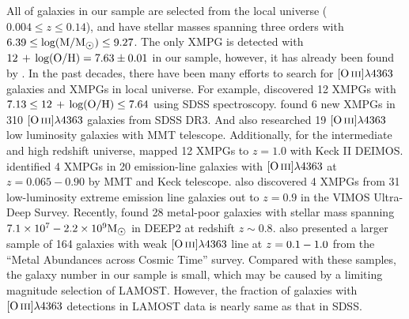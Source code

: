 \documentclass[usenatbib]{raa}
\begin{document}
All of galaxies in our sample  are selected from the local universe 
($0.004 \le z \le 0.14$), and have stellar masses  spanning 
three orders with $\rm 6.39 \le log(M/M_{\hbox{$\odot$}}) \le 9.27$. The only
XMPG is detected with $\hbox{$12\, +\, {\rm log(O/H)}$} = 7.63 \pm 0.01$ in our sample, however, it has already been found by 
\cite{2012AA...546A.122I}. In the past decades, there have been many efforts to search 
for $\hbox{[O\,{\sc iii}]}\lambda4363$ galaxies and XMPGs in local universe. For example, 
\cite{2003ApJ...593L..73K} discovered 12 XMPGs with $\rm 7.13 \le \hbox{$12\, +\, {\rm log(O/H)}$} 
\le 7.64$ using SDSS spectroscopy. \cite{2006AA...448..955I} found
6 new XMPGs in 310 $\hbox{[O\,{\sc iii}]}\lambda4363$ galaxies from SDSS DR3. And
\cite{2012ApJ...754...98B} also researched 19 $\hbox{[O\,{\sc iii}]}\lambda4363$ 
low luminosity galaxies with MMT telescope.
Additionally, for the intermediate and high redshift universe, 
\cite{2007ApJ...668..853K} mapped 12 XMPGs to $z = 1.0$
with Keck II DEIMOS. \cite{2014ApJ...780..122L} identified 
4 XMPGs in 20 emission-line galaxies with $\hbox{[O\,{\sc iii}]}\lambda4363$ at 
$z = 0.065-0.90$ by MMT and Keck telescope. 
\cite{2014AA...568L...8A} also discovered 4 XMPGs from 31 low-luminosity
extreme emission line galaxies out to $z = 0.9$ in the VIMOS
Ultra-Deep Survey. Recently, \cite{2015ApJ...805...45L} found 28 
metal-poor galaxies with stellar mass spanning
$\rm 7.1 \times 10^7 - 2.2 \times 10^9 M_{\hbox{$\odot$}}$ in DEEP2 at redshift $ z \sim 0.8$. 
\cite{2016ApJS..226....5L} also presented a larger sample of 164 galaxies with weak 
$\hbox{[O\,{\sc iii}]}\lambda4363$ line at $z = 0.1 \-- 1.0$ from the ``Metal Abundances across Cosmic Time'' survey. Compared with these 
samples, the galaxy number in our sample is small, which may be caused by 
 a limiting magnitude selection of LAMOST. However, 
the fraction of galaxies with $\hbox{[O\,{\sc iii}]}\lambda4363$ detections
in LAMOST data is nearly same as that in SDSS.
\end{document}
